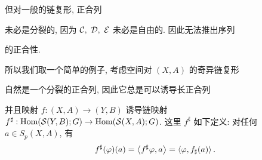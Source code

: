 但对一般的链复形, 正合列
\begin{center}
\end{center}
未必是分裂的, 因为 $ \mathcal{C},\ \mathcal{D},\ \mathcal{E} $ 未必是自由的. 因此无法推出序列
\begin{center}
\end{center}
的正合性.

所以我们取一个简单的例子, 考虑空间对 $ (X,A) $ 的奇异链复形
\begin{center}
\end{center}
自然是一个分裂的正合列, 因此它总是可以诱导长正合列
\begin{center}
\end{center}
并且映射 $ f : (X,A)\to (Y,B) $ 诱导链映射 $ f^\sharp : \mathrm{Hom}(\mathcal{S}(Y,B);G)\to\mathrm{Hom}(\mathcal{S}(X,A);G) $. 这里 $ f^\sharp $ 如下定义: 对任何 $ a\in S_p(X,A) $, 有
\[
	f^\sharp(\varphi)(a)=\left\langle f^\sharp\varphi,a \right\rangle=\left\langle \varphi,f_\sharp(a) \right\rangle.
\]

